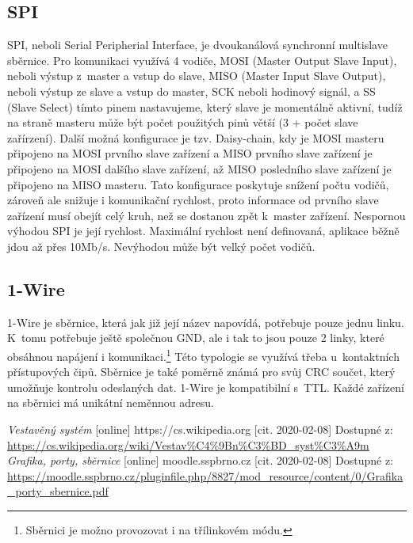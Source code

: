\documentclass[12pt]{article}
\begin{document}
   \subsection{SPI}
   SPI, neboli Serial Peripherial Interface, je dvoukanálová synchronní multislave sběrnice.
   Pro komunikaci využívá 4 vodiče, MOSI (Master Output Slave Input), neboli výstup z~master a vstup do slave, MISO (Master Input Slave Output), neboli výstup ze slave a vstup do master, SCK neboli hodinový signál, a SS (Slave Select) tímto pinem nastavujeme, který slave je momentálně aktivní, tudíž na straně masteru může být počet použitých pinů větší (3 + počet slave zařírzení).
   Další možná konfigurace je tzv. Daisy-chain, kdy je  MOSI masteru připojeno na MOSI prvního slave zařízení a MISO prvního slave zařízení je připojeno na MOSI dalšího slave zařízení, až MISO posledního slave zařízení je připojeno na MISO masteru.
   Tato konfigurace poskytuje snížení počtu vodičů, zároveň ale snižuje i komunikační rychlost, proto informace od prvního slave zařízení musí obejít celý kruh, než se dostanou zpět k~master zařízení.
   Nespornou výhodou SPI je její rychlost.
   Maximální rychlost není definovaná, aplikace běžně jdou až přes 10Mb/s.
   Nevýhodou může být velký počet vodičů.
  
   \subsection{1-Wire}
   1-Wire je sběrnice, která jak již její název napovídá, potřebuje pouze jednu linku.
   K~tomu potřebuje ještě společnou GND, ale i tak to jsou pouze 2 linky, které obsáhnou napájení i komunikaci.\footnote{Sběrnici je možno provozovat i na třílinkovém módu.}
   Této typologie se využívá třeba u~kontaktních přístupových čipů.
   Sběrnice je také poměrně známá pro svůj CRC součet, který umožňuje kontrolu odeslaných dat.
   1-Wire je kompatibilní s~TTL.
   Každé zařízení na sběrnici má unikátní neměnnou adresu.

    
\tableofcontents

\renewcommand{\refname}{Další zdroje}
\begin{thebibliography}{1}
	\textit{Vestavěný systém} [online] https://cs.wikipedia.org [cit. 2020-02-08] Dostupné z: \\ 
	\url{https://cs.wikipedia.org/wiki/Vestav%C4%9Bn%C3%BD_syst%C3%A9m }
	\textit{Grafika, porty, sběrnice} [online] moodle.sspbrno.cz [cit. 2020-02-08] Dostupné z: \\ 
\url{https://moodle.sspbrno.cz/pluginfile.php/8827/mod_resource/content/0/Grafika_porty_sbernice.pdf}
	

\end{thebibliography}


    
\end{document}
